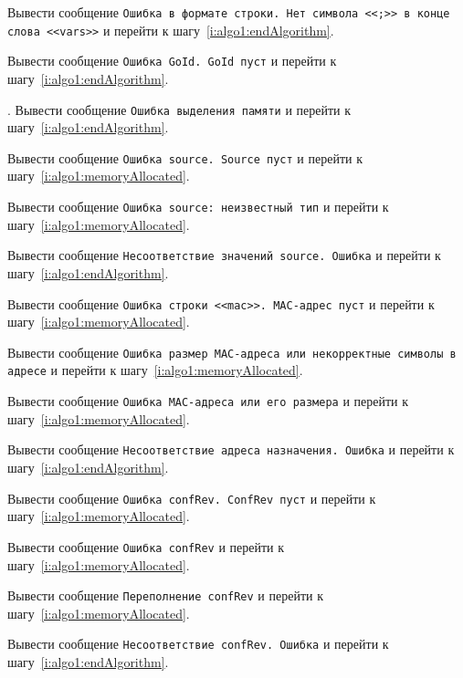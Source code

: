\begin{enumerate_step}
    \item \label{i:algo1:errorStringFormatVars} Вывести сообщение \texttt{Ошибка в формате строки. Нет символа
    <<;>> в конце слова <<vars>>} и перейти к шагу~\ref{i:algo1:endAlgorithm}.

    \item \label{i:algo1:goIdEmpty} Вывести сообщение \texttt{Ошибка GoId. GoId пуст} и перейти к шагу~\ref{i:algo1:endAlgorithm}.
    \item \label{i:algo1:noMalloc}. Вывести сообщение \texttt{Ошибка выделения памяти} и перейти к шагу~\ref{i:algo1:endAlgorithm}.
    \item \label{i:algo1:sourceEmpty} Вывести сообщение \texttt{Ошибка source. Source пуст} и перейти к шагу~\ref{i:algo1:memoryAllocated}.
    \item \label{i:algo1:ethUnknown} Вывести сообщение \texttt{Ошибка source: неизвестный тип} и перейти к шагу~\ref{i:algo1:memoryAllocated}.
    \item \label{i:algo1:mismatchSourse} Вывести сообщение \texttt{Несоответствие значений source. Ошибка} и перейти к шагу~\ref{i:algo1:endAlgorithm}.
    \item \label{i:algo1:macEmpty} Вывести сообщение \texttt{Ошибка строки <<mac>>. MAC-адрес пуст} и перейти к шагу~\ref{i:algo1:memoryAllocated}.
    \item \label{i:algo1:errorMacSize} Вывести сообщение \texttt{Ошибка размер MAC-адреса или некорректные символы в адресе} и перейти к шагу~\ref{i:algo1:memoryAllocated}.
    \item \label{i:algo1:errorMacConvert} Вывести сообщение \texttt{Ошибка MAC-адреса или его размера} и перейти к шагу~\ref{i:algo1:memoryAllocated}.
    \item \label{i:algo1:mismatchMac} Вывести сообщение \texttt{Несоответствие адреса назначения. Ошибка} и перейти к шагу~\ref{i:algo1:endAlgorithm}.
    \item \label{i:algo1:confRevEmpty} Вывести сообщение \texttt{Ошибка confRev. ConfRev пуст} и перейти к шагу~\ref{i:algo1:memoryAllocated}.
    \item \label{i:algo1:confRevError} Вывести сообщение \texttt{Ошибка confRev} и перейти к шагу~\ref{i:algo1:memoryAllocated}.
    \item \label{i:algo1:confRevOverflow} Вывести сообщение \texttt{Переполнение confRev} и перейти к шагу~\ref{i:algo1:memoryAllocated}.
    \item \label{i:algo1:mismatchConfRev} Вывести сообщение \texttt{Несоответствие confRev. Ошибка} и перейти к шагу~\ref{i:algo1:endAlgorithm}.

\end{enumerate_step}
